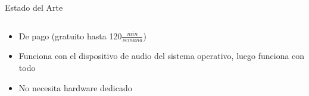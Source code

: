 \begin{frame}[t]{Estado del Arte}
\begin{columns}
\begin{column}[t]{0.4\textwidth}
\begin{itemize}
\begin{itemize}
					\item {}De pago (gratuito hasta 120$\frac{min}{semana}$)
					\item {}Funciona con el dispositivo de audio del sistema operativo, luego funciona con todo
					\item {}No necesita hardware dedicado
				\end{itemize}
			\end{itemize}
		\end{column}
	\end{columns}
\end{frame}